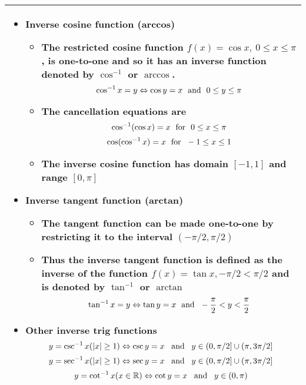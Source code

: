 \documentclass[fleqn]{article}
\begin{document}
\begin{center}
{\begin{tabularx}{.9\textwidth}{|X|}
\begin{itemize}
	\item \textbf{Inverse cosine function (arccos)}
	\begin{itemize}
		\item The restricted cosine function $f(x) = \cos x, \: 0 \le x \le \pi$, is one-to-one and so it has an inverse function denoted by $\cos^{-1}$ or $\arccos$.
		$$\cos^{-1} x = y \Leftrightarrow \cos y = x \text{\hspace{3pt} and \hspace{3pt}} 0 \le y \le \pi$$
		\item The cancellation equations are
		$$\cos^{-1}(\cos x) = x \text{\hspace{3pt} for \hspace{3pt}} 0 \le x \le \pi$$
		$$\cos(\cos^{-1}x) = x \text{\hspace{3pt} for \hspace{3pt}} -1 \le x \le 1$$
		\item The inverse cosine function has domain $[-1, 1]$ and range $[0,\pi]$
	\end{itemize}
	\vspace{5pt}

	\item \textbf{Inverse tangent function (arctan)}
	\begin{itemize}
		\item The tangent function can be made one-to-one by restricting it to the interval $(-\pi/2, \pi/2)$
		\item Thus the inverse tangent function is defined as the inverse of the function $f(x) = \tan x, -\pi/2 < \pi/2$ and is denoted by $\tan^{-1}$ or $\arctan$
	$$\tan^{-1} x = y \Leftrightarrow \tan y = x \text{\hspace{3pt} and \hspace{3pt}} -\dfrac{\pi}{2} < y < \dfrac{\pi}{2}$$
	\end{itemize}
	\vspace{5pt}

	\item \textbf{Other inverse trig functions}
		$$y = \csc^{-1} x(|x| \ge 1) \Leftrightarrow \csc y = x \text{\hspace{5pt} and \hspace{5pt}} y \in (0, \pi/2] \cup (\pi, 3\pi/2]$$
		$$y = \sec^{-1} x(|x| \ge 1) \Leftrightarrow \sec y = x \text{\hspace{5pt} and \hspace{5pt}} y \in (0, \pi/2] \cup (\pi, 3\pi/2]$$
		$$y = \cot^{-1} x(x \in \mathbb{R}) \Leftrightarrow \cot y = x \text{\hspace{5pt} and \hspace{5pt}} y \in (0, \pi)$$
	\end{itemize} \\
\hline
\end{tabularx}}
\vspace{12pt}	

\end{center}
\end{document}
